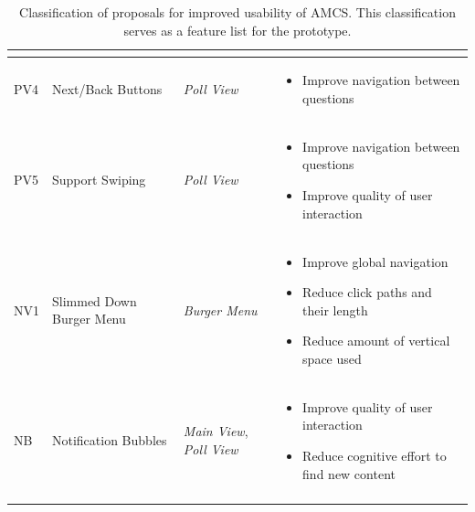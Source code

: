 \begin{longtable}{ | p{0.7cm} | p{2.8cm} | p{2cm} | p{7.6cm} |}
\begin{itemize}[leftmargin=*,noitemsep, topsep=0pt]
	\end{itemize} \vspace{-0.45cm} \\ \hline
	PV4 & Next/Back Buttons & \emph{Poll View} &
	\begin{itemize}[leftmargin=*,noitemsep, topsep=0pt]
		\item Improve navigation between questions
	\end{itemize} \vspace{-0.45cm} \\ \hline
	PV5 & Support Swiping & \emph{Poll View} &
	\vspace{-0.45cm}	
	\begin{itemize}[leftmargin=*,noitemsep, topsep=0pt]
		\item Improve navigation between questions
		\item Improve quality of user interaction
	\end{itemize} \vspace{-0.45cm} \\ \hline
	NV1 & Slimmed Down Burger Menu & \emph{Burger Menu} & 		\vspace{-0.45cm}	
	\begin{itemize}[leftmargin=*,noitemsep, topsep=0pt]
		\item Improve global navigation
		\item Reduce click paths and their length
		\item Reduce amount of vertical space used
	\end{itemize} \vspace{-0.45cm} \\ \hline
	NB & Notification Bubbles & \emph{Main View}, \newline \emph{Poll View} &
	\vspace{-0.45cm}	
	\begin{itemize}[leftmargin=*,noitemsep, topsep=0pt]
		\item Improve quality of user interaction
		\item Reduce cognitive effort to find new content
	\end{itemize} \vspace{-0.45cm} \\ \hline
	\caption{Classification of proposals for improved usability of AMCS. This classification serves as a feature list for the prototype.}
	\label{tab:proposals}
\end{longtable}
